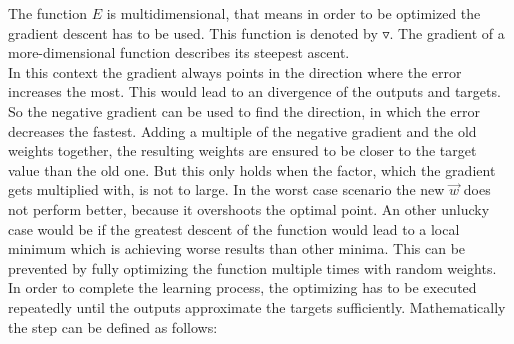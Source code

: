 \documentclass[12pt]{article}
\begin{document}
The function $E$ is multidimensional, that means in order to be optimized the \gls{gradient} descent has to be used. This function is denoted by $\triangledown$. The \gls{gradient} of a more-dimensional function describes its steepest ascent. \cite{grad} \\ In this context the \gls{gradient} always points in the direction where the error increases the most. This would lead to an \gls{divergence} of the \glspl{output} and \glspl{target}. So the negative \gls{gradient} can be used to find the direction, in which the error decreases the fastest. Adding a multiple of the negative \gls{gradient} and the old \glspl{weight} together, the resulting \glspl{weight} are ensured to be closer to the target value than the old one. But this only holds when the factor, which the \gls{gradient} gets multiplied with, is not to large. In the worst case scenario the new $\vec{w}$ does not perform better, because it overshoots the optimal point. An other unlucky case would be if the greatest descent of the function would lead to a local \gls{minimum} which is achieving worse results than other minima. This can be prevented by fully optimizing the function multiple times with random \glspl{weight}. In order to complete the learning process, the optimizing has to be executed repeatedly until the \glspl{output} approximate the \glspl{target} sufficiently. Mathematically the step can be defined as follows:
\end{document}
